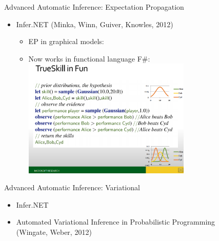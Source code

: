 \begin{frame}{Advanced Automatic Inference: Expectation Propagation}
    \begin{itemize}
      \item Infer.NET {\color{DarkBlue} (Minka, Winn, Guiver, Knowles, 2012)}
      \begin{itemize}
        \item EP in graphical models:
        \item Now works in functional language F\#:
        \includegraphics[width=8cm]{figures/fun}
      \end{itemize}
    \end{itemize}
    
\end{frame}

\begin{frame}{Advanced Automatic Inference: Variational}

    \begin{itemize}
      \item Infer.NET
      \item Automated Variational Inference in Probabilistic Programming
      \\ {\color{DarkBlue}  (Wingate, Weber, 2012) }
    \end{itemize}

\end{frame}




